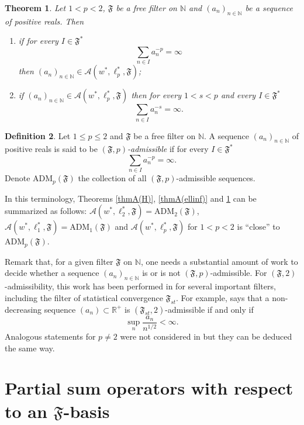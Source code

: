 \documentclass[11pt,twoside, reqno]{amsart}
\newcommand{\N}{{\mathbb N}}
\newcommand{\F}{\mathfrak{F}}
\newcommand{\ADM}{\mathrm{ADM}}
\theoremstyle{plain}
\newtheorem{theorem}{Theorem}[section]
\theoremstyle{remark}
\theoremstyle{definition}
\newtheorem{definition}[theorem]{Definition}
\numberwithin{equation}{section}
\begin{document}
\begin{theorem}  \label{theorE*=ell_pforF}
Let $1<p<2$,  $\F$ be a free filter on $\N$ and $(a_n)_{n \in \N}$ be a sequence of positive reals. Then 
\begin{enumerate}
\item[--]  if  for every $I \in \F^*$
$$
\sum\limits_{n \in I} a_n^{-p} = \infty
$$
then  $(a_n)_{n \in \N} \in \mathcal A(w^*, \ell_p^*, \F)$;


\item[--]  if $(a_n)_{n \in \N} \in \mathcal A(w^*, \ell_p^*, \F)$ then for every $1<s<p$ and  every $I \in \F^*$
$$
\sum\limits_{n \in I} a_n^{-s} = \infty.
$$
\end{enumerate}
\end{theorem}

\begin{definition} \label{def-p-admis}
Let $1 \le p \le 2$ and  $\F$ be a free filter on $\N$. A sequence $(a_n)_{n \in \N}$ of positive reals is said to be \emph{$(\F, p)$-admissible} if for every $I \in \F^*$
$$
\sum\limits_{n \in I} a_n^{-p} = \infty.
$$
Denote $\ADM_p(\F)$ the collection of all $(\F, p)$-admissible sequences.
\end{definition}

In this terminology, Theorems \ref{thmA(H)}, \ref{thmA(ellinf)} and \ref{theorE*=ell_pforF} can be summarized as follows: $\mathcal A(w^*, \ell_2^*, \F) = \ADM_2(\F)$,  $\mathcal A(w^*, \ell_1^*, \F) = \ADM_1(\F)$ and  $\mathcal A(w^*, \ell_p^*, \F)$ for $1<p<2$ is ``close'' to $\ADM_p(\F)$.

Remark that, for a given filter $\F$ on $\N$, one
needs a substantial amount of work to decide whether a sequence  $(a_n)_{n \in \N}$ is or is not $(\F, p)$-admissible. For $(\F, 2)$-admissibility, this work has been performed in \cite[Sections 4 and 5]{kaleor} for several important filters, including the filter of statistical convergence $\F_{st}$. For example, \cite [Corollary 4.3]{kaleor} says that a non-decreasing sequence $(a_n) \subset {\mathbb{R}}^+$ is $(\F_{st}, 2)$-admissible if and only if
\begin{equation}  \label{a-mon}
\sup_n \frac{a_{n}}{n^{1/2}} < \infty.
\end{equation}
Analogous statements for $p \neq 2$ were not considered in \cite{kaleor} but they can be deduced the same way.  


\section{Partial sum operators with respect to an $\F$-basis} \label{sec_4}
\end{document}
